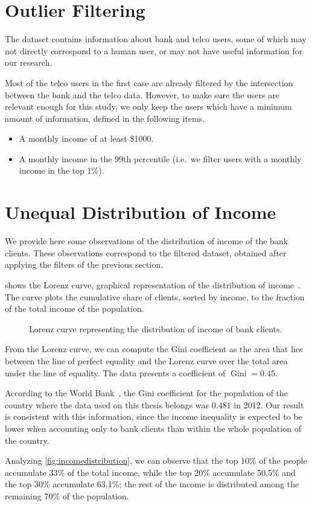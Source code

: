 \section{Outlier Filtering}
\label{subsec:outlier_filtering}

The dataset contains information about bank and telco users, some of which may not directly correspond to a human user, or may not have useful information for our research.

Most of the telco users in the first case are already filtered by the intersection between the bank and the telco data. However, to make sure the users are relevant enough for this study, we only keep the users which have a minimum amount of information, defined in the following items.

\begin{itemize}
	\item A monthly income of at least \$\num{1000}.
	\item A monthly income in the \num{99}th percentile (i.e.\ we filter users with a monthly income in the top 1\%).
\end{itemize}

\section{Unequal Distribution of Income}

We provide here some observations of the distribution of income of the bank clients. These observations correspond to the filtered dataset, obtained after applying the filters of the previous section.

 shows the Lorenz curve, graphical representation of the distribution of income~\cite{satchell1987}. The curve plots the cumulative share of clients, sorted by income, to the fraction of the total income of the population.

\begin{figure}
\centering
{}
\caption{Lorenz curve representing the distribution of income of bank clients.}
\label{fig:lorenz}
\end{figure}

From the Lorenz curve, we can compute the Gini coefficient as the area that lies between the line of perfect equality and the Lorenz curve over the total area under the line of equality. The data presents a coefficient of $\operatorname{Gini} = 0.45$.

According to the World Bank~\cite{world_bank}, the Gini coefficient for the population of the country where the data used on this thesis belongs was $0.481$ in 2012. Our result is consistent with this information, since the income inequality is expected to be lower when accounting only to bank clients than within the whole population of the country.

Analyzing \cref{fig:incomedistribution}, we can observe that the top 10\% of the people accumulate 33\% of the total income, while the top 20\% accumulate 50.5\% and the top 30\% accumulate 63.1\%; the rest of the income is distributed among the remaining 70\% of the population.
